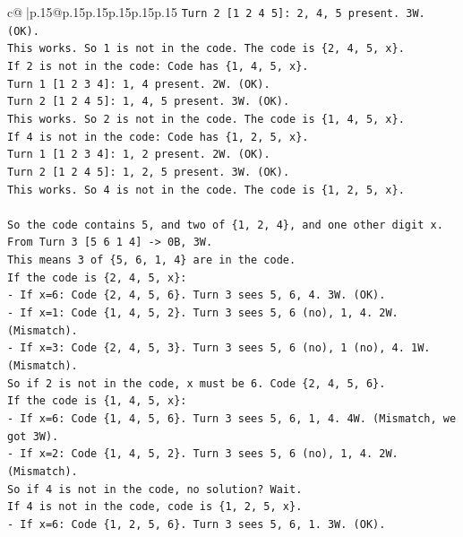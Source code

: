 \documentclass{article}
\begin{document}
{\begin{supertabular}{c@{$\;$}|p{.15\linewidth}@{}p{.15\linewidth}p{.15\linewidth}p{.15\linewidth}p{.15\linewidth}p{.15\linewidth}}
{{{\texttt{Turn 2 {[}1 2 4 5{]}: 2, 4, 5 present. 3W. (OK).} \\
\texttt{This works. So 1 is not in the code. The code is \{2, 4, 5, x\}.} \\
\texttt{If 2 is not in the code: Code has \{1, 4, 5, x\}.} \\
\texttt{Turn 1 {[}1 2 3 4{]}: 1, 4 present. 2W. (OK).} \\
\texttt{Turn 2 {[}1 2 4 5{]}: 1, 4, 5 present. 3W. (OK).} \\
\texttt{This works. So 2 is not in the code. The code is \{1, 4, 5, x\}.} \\
\texttt{If 4 is not in the code: Code has \{1, 2, 5, x\}.} \\
\texttt{Turn 1 {[}1 2 3 4{]}: 1, 2 present. 2W. (OK).} \\
\texttt{Turn 2 {[}1 2 4 5{]}: 1, 2, 5 present. 3W. (OK).} \\
\texttt{This works. So 4 is not in the code. The code is \{1, 2, 5, x\}.} \\
\\ 
\texttt{So the code contains 5, and two of \{1, 2, 4\}, and one other digit x.} \\
\texttt{From Turn 3 {[}5 6 1 4{]} {-}> 0B, 3W.} \\
\texttt{This means 3 of \{5, 6, 1, 4\} are in the code.} \\
\texttt{If the code is \{2, 4, 5, x\}:} \\
\texttt{{-} If x=6: Code \{2, 4, 5, 6\}. Turn 3 sees 5, 6, 4. 3W. (OK).} \\
\texttt{{-} If x=1: Code \{1, 4, 5, 2\}. Turn 3 sees 5, 6 (no), 1, 4. 2W. (Mismatch).} \\
\texttt{{-} If x=3: Code \{2, 4, 5, 3\}. Turn 3 sees 5, 6 (no), 1 (no), 4. 1W. (Mismatch).} \\
\texttt{So if 2 is not in the code, x must be 6. Code \{2, 4, 5, 6\}.} \\
\texttt{If the code is \{1, 4, 5, x\}:} \\
\texttt{{-} If x=6: Code \{1, 4, 5, 6\}. Turn 3 sees 5, 6, 1, 4. 4W. (Mismatch, we got 3W).} \\
\texttt{{-} If x=2: Code \{1, 4, 5, 2\}. Turn 3 sees 5, 6 (no), 1, 4. 2W. (Mismatch).} \\
\texttt{So if 4 is not in the code, no solution? Wait.} \\
\texttt{If 4 is not in the code, code is \{1, 2, 5, x\}.} \\
\texttt{{-} If x=6: Code \{1, 2, 5, 6\}. Turn 3 sees 5, 6, 1. 3W. (OK).} \\
}}}
\end{supertabular}}
\end{document}
